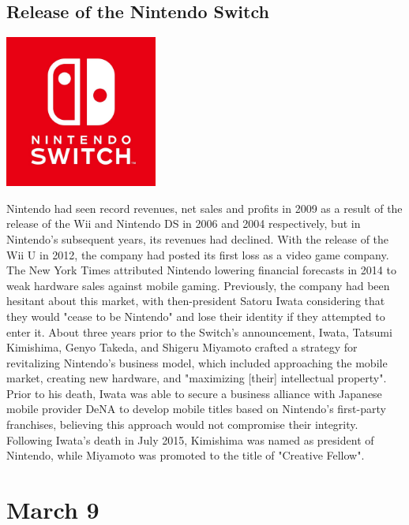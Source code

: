 \documentclass[11pt]{report}
\begin{document}
\subsection{Release of the Nintendo Switch}
\vspace{2mm}\begin{center}\includegraphics[width=5cm]{./img/nintendoswitchLogo.jpg}\end{center}
Nintendo had seen record revenues, net sales and profits in 2009 as a result of the release of the Wii and Nintendo DS in 2006 and 2004 respectively, but in Nintendo's subsequent years, its revenues had declined. With the release of the Wii U in 2012, the company had posted its first loss as a video game company. The New York Times attributed Nintendo lowering financial forecasts in 2014 to weak hardware sales against mobile gaming. Previously, the company had been hesitant about this market, with then-president Satoru Iwata considering that they would "cease to be Nintendo" and lose their identity if they attempted to enter it. About three years prior to the Switch's announcement, Iwata, Tatsumi Kimishima, Genyo Takeda, and Shigeru Miyamoto crafted a strategy for revitalizing Nintendo's business model, which included approaching the mobile market, creating new hardware, and "maximizing [their] intellectual property". Prior to his death, Iwata was able to secure a business alliance with Japanese mobile provider DeNA to develop mobile titles based on Nintendo's first-party franchises, believing this approach would not compromise their integrity. Following Iwata's death in July 2015, Kimishima was named as president of Nintendo, while Miyamoto was promoted to the title of "Creative Fellow".
\section{March 9}
\end{document}
